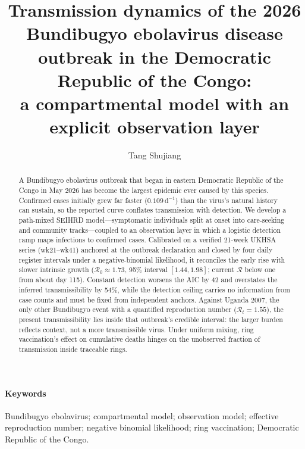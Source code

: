 \documentclass[10pt]{plos}
\newcommand{\Reff}{\mathcal{R}}
\begin{document}
\title{Transmission dynamics of the 2026 Bundibugyo ebolavirus disease
outbreak in the Democratic Republic of the Congo:\\
a compartmental model with an explicit observation layer}

\author{Tang Shujiang}
\maketitle

\begin{abstract}
A Bundibugyo ebolavirus outbreak that began in eastern Democratic
Republic of the Congo in May 2026 has become the largest epidemic ever
caused by this species. Confirmed cases initially grew far faster
($0.109\,\mathrm{d}^{-1}$) than the virus's natural history can sustain,
so the reported curve conflates transmission with detection. We develop a
path-mixed SEIHRD model---symptomatic individuals split at onset into
care-seeking and community tracks---coupled to an observation layer in
which a logistic detection ramp maps infections to confirmed cases.
Calibrated on a verified 21-week UKHSA series (wk21--wk41) anchored at
the outbreak declaration and closed by four daily register intervals
under a negative-binomial likelihood, it reconciles the early rise with
slower intrinsic growth ($\Reff_0\approx1.73$, 95\% interval
$[1.44,1.98]$; current $\Reff$ below one from about day 115). Constant
detection worsens the AIC by 42 and overstates the inferred
transmissibility by 54\%, while the detection ceiling carries no
information from case counts and must be fixed from independent anchors.
Against Uganda 2007, the only other Bundibugyo event with a quantified
reproduction number ($\Reff_t=1.55$), the present transmissibility lies
inside that outbreak's credible interval: the larger burden reflects
context, not a more transmissible virus. Under uniform mixing, ring
vaccination's effect on cumulative deaths hinges on the unobserved
fraction of transmission inside traceable rings.
\end{abstract}

\paragraph*{Keywords}
Bundibugyo ebolavirus; compartmental model; observation model; effective
reproduction number; negative binomial likelihood; ring vaccination;
Democratic Republic of the Congo.
\end{document}
